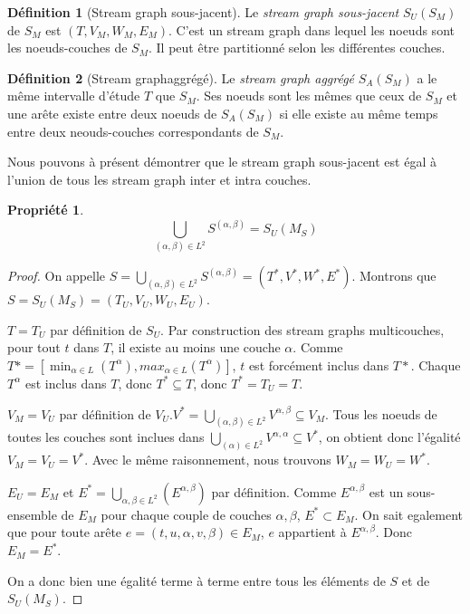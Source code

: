 \documentclass[11pt,a4paper]{article}
\newtheorem{prop}{Propriété}
\theoremstyle{definition}
\newtheorem{defn}{Définition}
\theoremstyle{remark}
\theoremstyle{remark}
\def \stg {stream graph}
\def \Stg {Stream graph}
\def \stgms {stream graphs multicouches}
\begin{document}
	

	
	\begin{defn}[\Stg{} sous-jacent]
	Le {\em \stg{} sous-jacent} $S_U(S_M)$ de $S_M$ est $(T,V_M,W_M,E_M)$. C'est un \stg{} dans lequel les noeuds sont les noeuds-couches de $S_M$. Il peut être partitionné selon les différentes couches.
	\end{defn}
	
	\begin{defn}[\Stg aggrégé]
		Le {\em \stg{} aggrégé} $S_A(S_M)$ a le même intervalle d'étude $T$ que $S_M$. Ses noeuds sont les mêmes que ceux de $S_M$ et une arête existe entre deux noeuds de $S_A(S_M)$ si elle existe au même temps entre deux neouds-couches correspondants de $S_M$. 
	\end{defn}
	
	Nous pouvons à présent démontrer que le \stg{} sous-jacent est égal à l'union de tous les \stg{} inter et intra couches.
	
		
	\begin{prop}
		\[
			\bigcup_{(\alpha,\beta) \in L^2} S^{(\alpha,\beta)} = S_U(M_S)
		\]
	\end{prop}
	\begin{proof}
	On appelle $S=\bigcup_{(\alpha,\beta) \in L^2} S^{(\alpha,\beta)}=(T^{*},V^{*},W^{*},E^{*})$. Montrons que $S=S_U(M_S)= (T_U,V_U,W_U,E_U)$.
	
	$T=T_U$ par définition de $S_U$. Par construction des \stgms{}, pour tout $t$ dans $T$, il existe au moins une couche $\alpha$. Comme $T* = [\min_{\alpha \in L} (T^{\alpha}),max_{\alpha \in L} (T^{\alpha})]$, $t$ est forcément inclus dans $T*$. Chaque $T^{\alpha}$ est inclus dans $T$, donc $T^* \subseteq T$, donc $T^*=T_U=T$.
	
	$V_M = V_U$ par définition de $V_U$.$V^{*}=\bigcup_{(\alpha,\beta) \in L^2} V^{\alpha,\beta} \subseteq V_M$. Tous les noeuds de toutes les couches sont inclues dans $\bigcup_{(\alpha) \in L^2} V^{\alpha,\alpha} \subseteq V^{*}$, on obtient donc l'égalité $V_M=V_U=V^*$.
	Avec le même raisonnement, nous trouvons $W_M=W_U=W^*$.
	
	$E_U=E_M$ et $E^{*}=\bigcup_{\alpha,\beta \in L^2}(E^{\alpha,\beta})$ par définition. Comme $E^{\alpha,\beta}$ est un sous-ensemble de $E_M$ pour chaque couple de couches $\alpha,\beta$, $E^{*} \subset E_M$. On sait egalement que pour toute arête $e =(t,u,\alpha,v,\beta) \in E_M$, $e$ appartient à $E^{\alpha,\beta}$. Donc $E_M=E^{*}$.


On a donc bien une égalité terme à terme entre tous les éléments de $S$ et de $S_U(M_S)$.					
	\end{proof}
\end{document}
